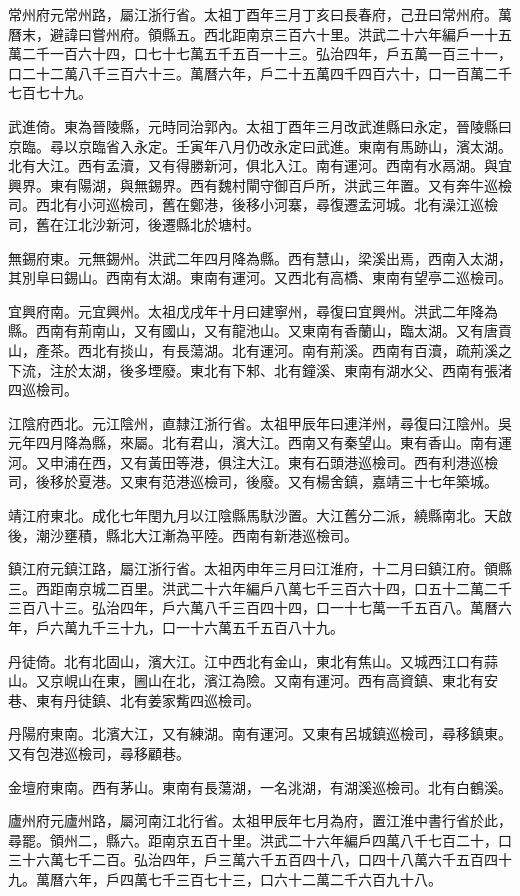 常州府元常州路，屬江浙行省。太祖丁酉年三月丁亥曰長春府，己丑曰常州府。萬曆末，避諱曰嘗州府。領縣五。西北距南京三百六十里。洪武二十六年編戶一十五萬二千一百六十四，口七十七萬五千五百一十三。弘治四年，戶五萬一百三十一，口二十二萬八千三百六十三。萬曆六年，戶二十五萬四千四百六十，口一百萬二千七百七十九。

武進倚。東為晉陵縣，元時同治郭內。太祖丁酉年三月改武進縣曰永定，晉陵縣曰京臨。尋以京臨省入永定。壬寅年八月仍改永定曰武進。東南有馬跡山，濱太湖。北有大江。西有孟瀆，又有得勝新河，俱北入江。南有運河。西南有水鬲湖。與宜興界。東有陽湖，與無錫界。西有魏村閘守御百戶所，洪武三年置。又有奔牛巡檢司。西北有小河巡檢司，舊在鄭港，後移小河寨，尋復遷孟河城。北有澡江巡檢司，舊在江北沙新河，後遷縣北於塘村。

無錫府東。元無錫州。洪武二年四月降為縣。西有慧山，梁溪出焉，西南入太湖，其別阜曰錫山。西南有太湖。東南有運河。又西北有高橋、東南有望亭二巡檢司。

宜興府南。元宜興州。太祖戊戌年十月曰建寧州，尋復曰宜興州。洪武二年降為縣。西南有荊南山，又有國山，又有龍池山。又東南有香蘭山，臨太湖。又有唐貢山，產茶。西北有掞山，有長蕩湖。北有運河。南有荊溪。西南有百瀆，疏荊溪之下流，注於太湖，後多堙廢。東北有下邾、北有鐘溪、東南有湖水父、西南有張渚四巡檢司。

江陰府西北。元江陰州，直隸江浙行省。太祖甲辰年曰連洋州，尋復曰江陰州。吳元年四月降為縣，來屬。北有君山，濱大江。西南又有秦望山。東有香山。南有運河。又申浦在西，又有黃田等港，俱注大江。東有石頭港巡檢司。西有利港巡檢司，後移於夏港。又東有范港巡檢司，後廢。又有楊舍鎮，嘉靖三十七年築城。

靖江府東北。成化七年閏九月以江陰縣馬馱沙置。大江舊分二派，繞縣南北。天啟後，潮沙壅積，縣北大江漸為平陸。西南有新港巡檢司。

鎮江府元鎮江路，屬江浙行省。太祖丙申年三月曰江淮府，十二月曰鎮江府。領縣三。西距南京城二百里。洪武二十六年編戶八萬七千三百六十四，口五十二萬二千三百八十三。弘治四年，戶六萬八千三百四十四，口一十七萬一千五百八。萬曆六年，戶六萬九千三十九，口一十六萬五千五百八十九。

丹徒倚。北有北固山，濱大江。江中西北有金山，東北有焦山。又城西江口有蒜山。又京峴山在東，圌山在北，濱江為險。又南有運河。西有高資鎮、東北有安巷、東有丹徒鎮、北有姜家觜四巡檢司。

丹陽府東南。北濱大江，又有練湖。南有運河。又東有呂城鎮巡檢司，尋移鎮東。又有包港巡檢司，尋移顧巷。

金壇府東南。西有茅山。東南有長蕩湖，一名洮湖，有湖溪巡檢司。北有白鶴溪。

廬州府元廬州路，屬河南江北行省。太祖甲辰年七月為府，置江淮中書行省於此，尋罷。領州二，縣六。距南京五百十里。洪武二十六年編戶四萬八千七百二十，口三十六萬七千二百。弘治四年，戶三萬六千五百四十八，口四十八萬六千五百四十九。萬曆六年，戶四萬七千三百七十三，口六十二萬二千六百九十八。

